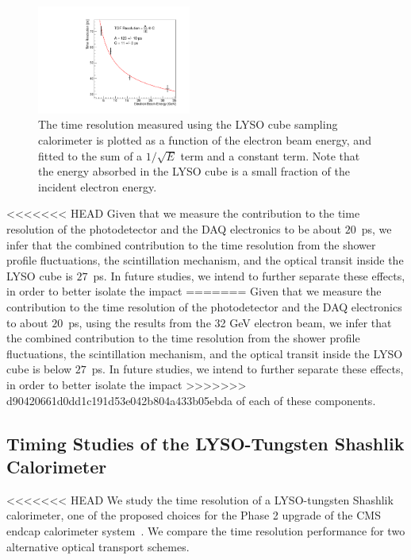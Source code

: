 \documentclass[12pt]{article}
\begin{document}
\begin{figure}[h] \centering
\includegraphics[width=0.45\textwidth]{figs/TimeResolutionVsEnergy_CrystalCube} 
\caption{ The time resolution measured using the LYSO cube sampling calorimeter
is plotted as a function of the electron beam energy, and fitted to the sum of a
$1/\sqrt{E}$ term and a constant term. Note that the energy absorbed in the LYSO
cube is a small fraction of the incident electron energy.}
\label{fig:LYSOCubeTOFResolutionVsEnergy}
\end{figure}

<<<<<<< HEAD
Given that we measure the contribution to the time 
resolution of the photodetector and the DAQ electronics
to be about $20$~ps, we infer that the combined contribution to the time 
resolution from the shower profile fluctuations, the scintillation mechanism,
and the optical transit inside the LYSO cube is $27$~ps. In future studies, we intend 
to further separate these effects, in order to better isolate the impact 
=======
Given that we measure the contribution to the time resolution of the
photodetector and the DAQ electronics to about $20$~ps, using the results from
the 32 GeV electron beam, we infer that the combined contribution to the time resolution
from the shower profile fluctuations, the scintillation mechanism, and the
optical transit inside the LYSO cube is below $27$~ps. In future studies, we
intend to further separate these effects, in order to better isolate the impact
>>>>>>> d90420661d0dd1c191d53e042b804a433b05ebda
of each of these components.

\subsection{Timing Studies of the LYSO-Tungsten Shashlik Calorimeter}

<<<<<<< HEAD
We study the time resolution of a LYSO-tungsten Shashlik
calorimeter, one of the proposed choices for the Phase 2 upgrade of the
CMS endcap calorimeter system~\cite{???}. We compare the time resolution
performance for two alternative optical transport schemes. 
\end{document}
